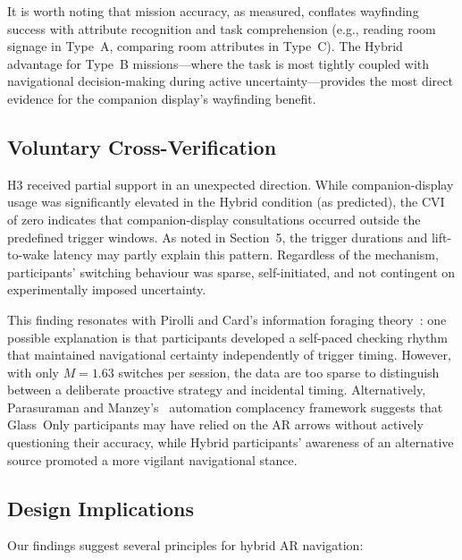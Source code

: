\documentclass[review]{vgtc}           %
\begin{document}
It is worth noting that mission accuracy, as measured, conflates
wayfinding success with attribute recognition and task comprehension
(e.g., reading room signage in Type~A, comparing room attributes in
Type~C). The Hybrid advantage for Type~B missions---where the task
is most tightly coupled with navigational decision-making during
active uncertainty---provides the most direct evidence for the
companion display's wayfinding benefit.

\subsection{Voluntary Cross-Verification}

H3 received partial support in an unexpected direction. While
companion-display usage was significantly elevated in the Hybrid
condition (as predicted), the CVI of zero indicates that companion-display
consultations occurred outside the predefined trigger windows.
As noted in Section~5, the trigger durations and lift-to-wake latency
may partly explain this pattern. Regardless of the mechanism,
participants' switching behaviour was sparse, self-initiated, and not
contingent on experimentally imposed uncertainty.

This finding resonates with Pirolli and Card's information foraging
theory~\cite{Pirolli:1999:IF}: one possible explanation is that
participants developed a self-paced checking rhythm that maintained
navigational certainty independently of trigger timing. However, with
only $M = 1.63$ switches per session, the data are too sparse to
distinguish between a deliberate proactive strategy and incidental
timing. Alternatively,
Parasuraman and Manzey's~\cite{Parasuraman:2010:CAB} automation
complacency framework suggests that Glass~Only participants may have
relied on the AR arrows without actively questioning their accuracy,
while Hybrid participants' awareness of an alternative source
promoted a more vigilant navigational stance.

\subsection{Design Implications}

Our findings suggest several principles for hybrid AR navigation:
\end{document}
